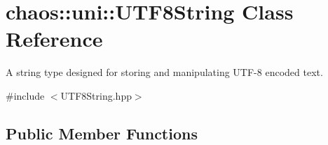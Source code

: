 \hypertarget{classchaos_1_1uni_1_1_u_t_f8_string}{\section{chaos\-:\-:uni\-:\-:U\-T\-F8\-String Class Reference}
\label{classchaos_1_1uni_1_1_u_t_f8_string}
}


A string type designed for storing and manipulating U\-T\-F-\/8 encoded text.  




{\ttfamily \#include $<$U\-T\-F8\-String.\-hpp$>$}

\subsection*{Public Member Functions}
